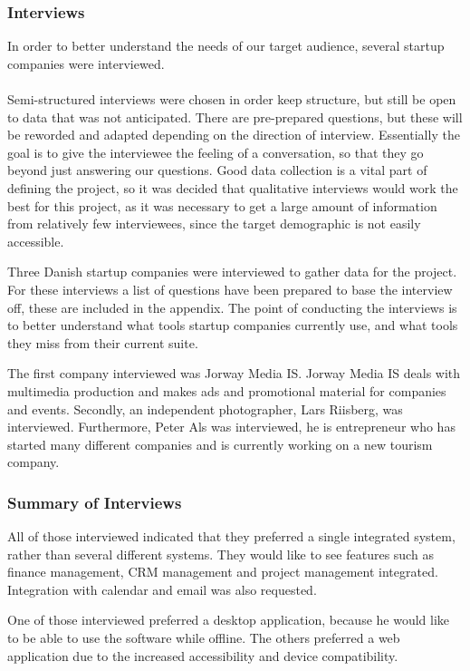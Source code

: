 \subsubsection{Interviews}
In order to better understand the needs of our target audience, several startup companies were interviewed.\\
\\
Semi-structured interviews were chosen in order keep structure, but still be open to data that was not anticipated. There are pre-prepared questions, but these will be reworded and adapted depending on the direction of interview. Essentially the goal is to give the interviewee the feeling of a conversation, so that they go beyond just answering our questions. Good data collection is a vital part of defining the project, so it was decided that qualitative interviews would work the best for this project, as it was necessary to get a large amount of information from relatively few interviewees, since the target demographic is not easily accessible. 

Three Danish startup companies were interviewed to gather data for the project. For these interviews a list of questions have been prepared to base the interview off, these are included in the appendix. The point of conducting the interviews is to better understand what tools startup companies currently use, and what tools they miss from their current suite.

The first company interviewed was Jorway Media IS. Jorway Media IS deals with multimedia production and makes ads and promotional material for companies and events.
Secondly, an independent photographer, Lars Riisberg, was interviewed.
Furthermore, Peter Als was interviewed, he is entrepreneur who has started many different companies and is currently working on a new tourism company.

\subsubsection{Summary of Interviews}

All of those interviewed indicated that they preferred a single integrated system, rather than several different systems. They would like to see features such as finance management, CRM management and project management integrated. Integration with calendar and email was also requested.

One of those interviewed preferred a desktop application, because he would like to be able to use the software while offline. The others preferred a web application due to the increased accessibility and device compatibility.

